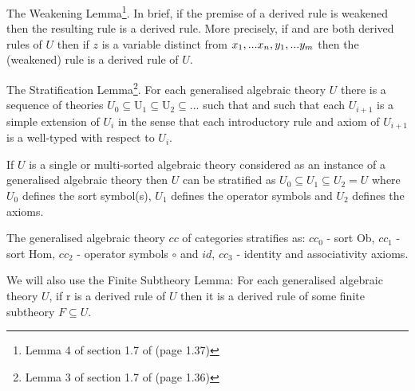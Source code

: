 \note The Weakening Lemma\footnote{Lemma 4 of section 1.7 of \cite{Cartmell78} (page 1.37)}. In brief, if the premise of a derived rule is weakened then the resulting rule is a derived rule. More precisely, if 
  and
 are both derived rules of $U$ then if $z$ is a variable
distinct from $x_1,...x_n,y_1,...y_m$ then
the (weakened) rule  is a derived rule
of $U$.

\note The Stratification Lemma\footnote{Lemma 3 of section 1.7 of \cite{Cartmell78} (page 1.36)}. For each generalised algebraic theory $U$  there is a sequence of theories 
$U_0 \subseteq $U$_1 \subseteq $U$_2 \subseteq ...$ such that  
and such that each $U_{i+1}$ is a simple extension of $U_i$ in the sense that each introductory rule and axiom of $U_{i+1}$ is a well-typed  with respect to $U_i$.

\note
If $U$ is a single or multi-sorted algebraic theory considered as an instance of a
 generalised algebraic theory then $U$ can be stratified as $U_0 \subseteq U_1 \subseteq U_2=U$
where $U_0$ defines the sort symbol(s), $U_1$ defines the operator symbols and $U_2$ defines the axioms. 

\note The generalised algebraic theory $cc$ of categories stratifies as: $cc_0$ - sort Ob,
$cc_1$ - sort Hom, $cc_2$ - operator symbols $\circ$ and $id$, $cc_3$ - identity and associativity axioms.
 

\note We will also use the Finite Subtheory Lemma: For each generalised algebraic theory $U$, if r is a derived rule of $U$ then it is a derived rule of some finite subtheory $F \subseteq U$. \




